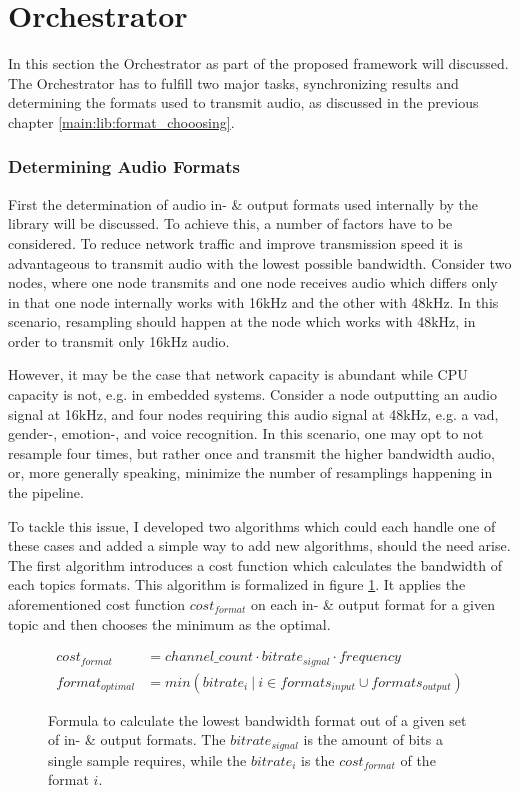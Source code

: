


\section{Orchestrator}
\label{main:orc}
In this section the Orchestrator as part of the proposed framework will discussed.
The Orchestrator has to fulfill two major tasks, synchronizing results and determining the formats used to transmit audio, as discussed in the previous chapter \ref{main:lib:format_chooosing}.

\subsubsection{Determining Audio Formats}
First the determination of audio in- \& output formats used internally by the library will be discussed.
To achieve this, a number of factors have to be considered.
To reduce network traffic and improve transmission speed it is advantageous to transmit audio with the lowest possible bandwidth.
Consider two nodes, where one node transmits and one node receives audio which differs only in that one node internally works with 16kHz and the other with 48kHz.
In this scenario, resampling should happen at the node which works with 48kHz, in order to transmit only 16kHz audio.

However, it may be the case that network capacity is abundant while CPU capacity is not, e.g. in embedded systems.
Consider a node outputting an audio signal at 16kHz, and four nodes requiring this audio signal at 48kHz, e.g. a \gls{vad}, gender-, emotion-, and voice recognition.
In this scenario, one may opt to not resample four times, but rather once and transmit the higher bandwidth audio, or, more generally speaking, minimize the number of resamplings happening in the pipeline.

To tackle this issue, I developed two algorithms which could each handle one of these cases and added a simple way to add new algorithms, should the need arise.
The first algorithm introduces a cost function which calculates the bandwidth of each topics formats.
This algorithm is formalized in figure \ref{main:orc:resampling:formula:min_traffic}.
It applies the aforementioned cost function $cost_{format}$ on each in- \& output format for a given topic and then chooses the minimum as the optimal.

\begin{figure}
	\begin{align*}
	cost_{format} &= channel\_count \cdot bitrate_{signal} \cdot frequency\\
	format_{optimal} &= min({bitrate_{i}\ |\ i \in formats_{input} \cup formats_{output}})
	\end{align*}
	\caption{Formula to calculate the lowest bandwidth format out of a given set of in- \& output formats.
		The $bitrate_{signal}$ is the amount of bits a single sample requires, while the $bitrate_{i}$ is the $cost_{format}$ of the format $i$.}
	\label{main:orc:resampling:formula:min_traffic}
\end{figure}


